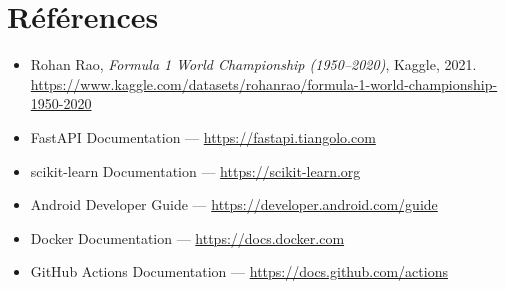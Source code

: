\documentclass[12pt, a4paper]{article}
\begin{document}
\section*{Références}

\begin{itemize}
    \item Rohan Rao, \textit{Formula 1 World Championship (1950–2020)}, Kaggle, 2021.\\
          \url{https://www.kaggle.com/datasets/rohanrao/formula-1-world-championship-1950-2020}
    \item FastAPI Documentation — \url{https://fastapi.tiangolo.com}
    \item scikit-learn Documentation — \url{https://scikit-learn.org}
    \item Android Developer Guide — \url{https://developer.android.com/guide}
    \item Docker Documentation — \url{https://docs.docker.com}
    \item GitHub Actions Documentation — \url{https://docs.github.com/actions}
\end{itemize}
\end{document}
